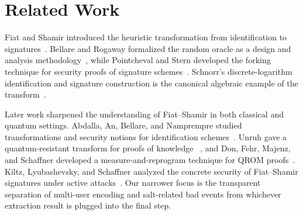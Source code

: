 \section{Related Work}
\label{sec:related}

Fiat and Shamir introduced the heuristic transformation from identification to
signatures~\cite{FiatShamir1986}.  Bellare and Rogaway formalized the random
oracle as a design and analysis methodology~\cite{BellareRogaway1993}, while
Pointcheval and Stern developed the forking technique for security proofs of
signature schemes~\cite{PointchevalStern1996}.  Schnorr's discrete-logarithm
identification and signature construction is the canonical algebraic example
of the transform~\cite{Schnorr1991}.

Later work sharpened the understanding of Fiat--Shamir in both classical and
quantum settings.  Abdalla, An, Bellare, and Namprempre studied transformations
and security notions for identification schemes~\cite{AbdallaEtAl2002}.
Unruh gave a quantum-resistant transform for proofs of knowledge
~\cite{Unruh2015}, and Don, Fehr, Majenz, and Schaffner developed a
measure-and-reprogram technique for QROM proofs~\cite{DonEtAl2019}.  Kiltz,
Lyubashevsky, and Schaffner analyzed the concrete security of Fiat--Shamir
signatures under active attacks~\cite{KiltzEtAl2018}.  Our narrower focus is
the transparent separation of multi-user encoding and salt-related bad events
from whichever extraction result is plugged into the final step.

